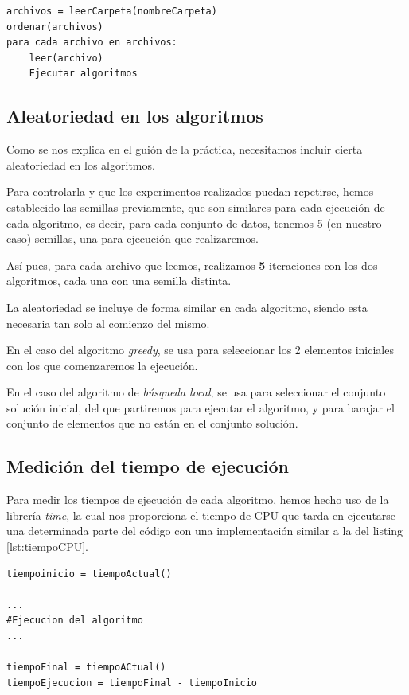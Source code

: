 \begin{lstlisting}[frame=single, caption={Versión búsqueda local}, captionpos=b, label=lst:lecturaArchivos]
archivos = leerCarpeta(nombreCarpeta)
ordenar(archivos)
para cada archivo en archivos:
    leer(archivo)
    Ejecutar algoritmos
\end{lstlisting}


\subsection{Aleatoriedad en los algoritmos}

Como se nos explica en el guión de la práctica, necesitamos incluir cierta aleatoriedad en los algoritmos.

Para controlarla y que los experimentos realizados puedan repetirse, hemos establecido las semillas previamente, que son similares para cada ejecución de cada algoritmo, es decir, para cada conjunto de datos, tenemos 5 (en nuestro caso) semillas, una para ejecución que realizaremos.

Así pues, para cada archivo que leemos, realizamos \textbf{5} iteraciones con los dos algoritmos, cada una con una semilla distinta.

La aleatoriedad se incluye de forma similar en cada algoritmo, siendo esta necesaria tan solo al comienzo del mismo.

En el caso del algoritmo \textit{greedy}, se usa para seleccionar los 2 elementos iniciales con los que comenzaremos la ejecución.

En el caso del algoritmo de \textit{búsqueda local}, se usa para seleccionar el conjunto solución inicial, del que partiremos para ejecutar el algoritmo, y para barajar el conjunto de elementos que no están en el conjunto solución.

\subsection{Medición del tiempo de ejecución}

Para medir los tiempos de ejecución de cada algoritmo, hemos hecho uso de la librería \textit{time}, la cual nos proporciona el tiempo de CPU que tarda en ejecutarse una determinada parte del código con una implementación similar a la del listing \ref{lst:tiempoCPU}.

\begin{lstlisting}[frame=single, caption={Tiempo de ejecución de un programa}, captionpos=b, label=lst:tiempoCPU]
tiempoinicio = tiempoActual()

...
#Ejecucion del algoritmo
...

tiempoFinal = tiempoACtual()
tiempoEjecucion = tiempoFinal - tiempoInicio
\end{lstlisting}

